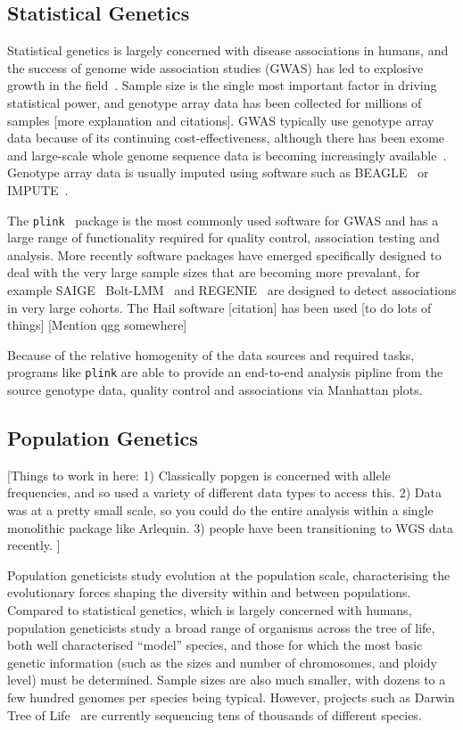 \documentclass[a4paper,num-refs]{oup-contemporary}
\newcommand{\toolname}[1]{\texttt{#1}}
\begin{document}
\subsection{Statistical Genetics}
Statistical genetics is largely concerned with disease associations
in humans, and the success of genome wide association studies (GWAS) has led
to explosive growth in the field~\citep{uffelmann2021genome}.
Sample size is the single most
important factor in driving statistical power, and
genotype array data has been collected for millions of samples
[more explanation and citations].
GWAS typically use genotype array data because of
its continuing cost-effectiveness, although there has been
exome~\citep{lek2016analysis,backman2021exome}
and large-scale whole genome sequence data is becoming increasingly
available~\citep{halldorsson2022sequences,uk2023whole}.
Genotype array data is usually imputed using software such
as BEAGLE~\citep{browning2018one} or IMPUTE~\citep{howie2011genotype}.

The \toolname{plink}~\citep{purcell2007plink} package is the most
commonly used software for GWAS and has a large range of functionality
required for quality control, association testing and analysis.
More recently software packages have emerged specifically designed
to deal with the very large sample sizes that are becoming
more prevalant, for example SAIGE~\citep{zhou2018efficiently}
Bolt-LMM~\citep{loh2015efficient}
and
REGENIE~\citep{mbatchou2021computationally} are designed to
detect associations in very large cohorts.
The Hail software [citation] has been used [to do lots of things]
[Mention qgg somewhere\citep{rohde2020qgg}]

Because of the relative homogenity of the data sources and
required tasks, programs like \toolname{plink} are able to provide
an end-to-end analysis pipline from the source genotype data, quality
control and associations via Manhattan plots.

\subsection{Population Genetics}
[Things to work in here:
1) Classically popgen is concerned with allele frequencies, and so
used a variety of different data types to access this.
2) Data was at a pretty small scale, so you could do the entire
analysis within a single monolithic package like Arlequin.
3) people have been transitioning to WGS data recently.
]

Population geneticists study evolution at the population scale,
characterising the evolutionary forces shaping the diversity
within and between populations. Compared to statistical genetics,
which is largely concerned with humans, population geneticists
study a broad range of organisms across the tree of life, both well
characterised ``model'' species, and those for which the most basic
genetic information (such as the sizes and number of chromosomes,
and ploidy level) must be determined.
Sample sizes are also much smaller,
with dozens to a few hundred genomes per species being typical.
However, projects such as Darwin Tree of
Life~\citep{darwin2022sequence} are currently sequencing tens of
thousands of different species.
\end{document}
